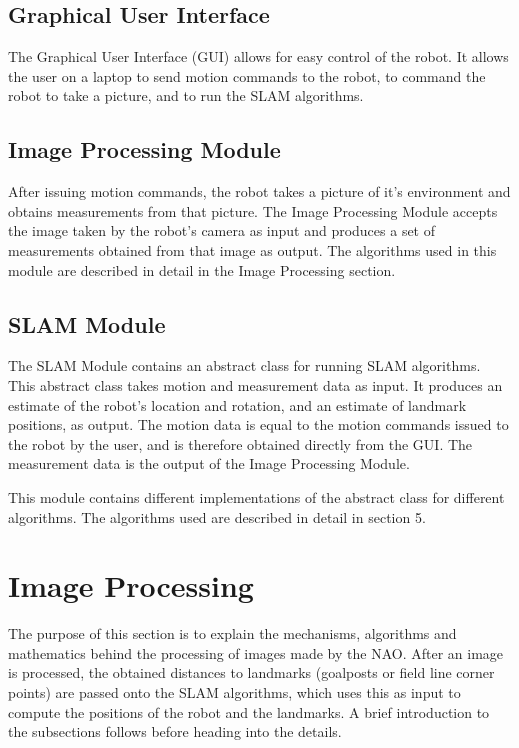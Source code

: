 \documentclass{ba-kecs}
\numberwithin{figure}{section}
\numberwithin{equation}{section}
\begin{document}
\subsection{Graphical User Interface}
The Graphical User Interface (GUI) allows for easy control of the robot. It allows the user on a laptop to send motion commands to the robot, to command the robot to take a picture, and to run the SLAM algorithms.

\subsection{Image Processing Module}
After issuing motion commands, the robot takes a picture of it's environment and obtains measurements from that picture. The Image Processing Module accepts the image taken by the robot's camera as input and produces a set of measurements obtained from that image as output. The algorithms used in this module are described in detail in the Image Processing section.

\subsection{SLAM Module}
The SLAM Module contains an abstract class for running SLAM algorithms. This abstract class takes motion and measurement data as input. It produces an estimate of the robot's location and rotation, and an estimate of landmark positions, as output. The motion data is equal to the motion commands issued to the robot by the user, and is therefore obtained directly from the GUI. The measurement data is the output of the Image Processing Module.

This module contains different implementations of the abstract class for different algorithms. The algorithms used are described in detail in section 5.






\section{Image Processing}

The purpose of this section is to explain the mechanisms, algorithms and mathematics behind the processing of images made by the NAO.
After an image is processed, the obtained distances to landmarks (goalposts or field line corner points) are passed onto the SLAM algorithms, which uses this as input to compute the positions of the robot and the landmarks.
A brief introduction to the subsections follows before heading into the details.
\end{document}
